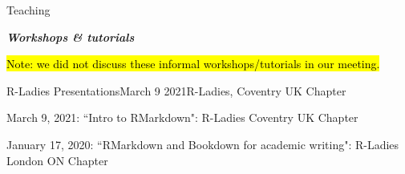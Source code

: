 \documentclass{resume} %
\begin{document}
\begin{rSection}{Teaching}
%	
%
%	
%	
%
%
%	

\begin{center}
		{\bf \emph{Workshops \& tutorials}}
		
		\hl{Note: we did not discuss these informal workshops/tutorials in our meeting.}
\end{center}

	\begin{rSubsection}{R-Ladies Presentations}{March 9 2021}{R-Ladies, Coventry UK Chapter}{}
		\item March 9, 2021: ``Intro to RMarkdown": R-Ladies Coventry UK Chapter
		\item January 17, 2020: ``RMarkdown and Bookdown for academic writing": R-Ladies London ON Chapter
	\end{rSubsection}


\end{rSection}
\end{document}

